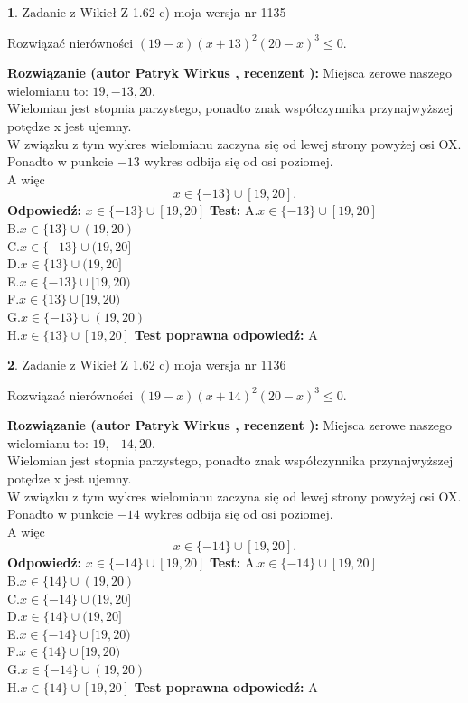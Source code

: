 \documentclass[12pt, a4paper]{article}
\theoremstyle{definition} %
\newtheorem{zad}{}
\newcommand{\zadStart}[1]{\begin{zad}#1\newline}
\newcommand{\zadStop}{\end{zad}}
\newcommand{\rozwStart}[2]{\noindent \textbf{Rozwiązanie (autor #1 , recenzent #2): }\newline}
\newcommand{\rozwStop}{\newline}
\newcommand{\odpStart}{\noindent \textbf{Odpowiedź:}\newline}
\newcommand{\odpStop}{\newline}
\newcommand{\testStart}{\noindent \textbf{Test:}\newline}
\newcommand{\testStop}{\newline}
\newcommand{\kluczStart}{\noindent \textbf{Test poprawna odpowiedź:}\newline}
\newcommand{\kluczStop}{\newline}
\begin{document}
\zadStart{Zadanie z Wikieł Z 1.62 c) moja wersja nr 1135}

Rozwiązać nierówności $(19-x)(x+13)^{2}(20-x)^{3}\le0$.
\zadStop
\rozwStart{Patryk Wirkus}{}
Miejsca zerowe naszego wielomianu to: $19, -13, 20$.\\
Wielomian jest stopnia parzystego, ponadto znak współczynnika przy\linebreak najwyższej potędze x jest ujemny.\\ W związku z tym wykres wielomianu zaczyna się od lewej strony powyżej osi OX.\\
Ponadto w punkcie $-13$ wykres odbija się od osi poziomej.\\
A więc $$x \in \{-13\} \cup [19,20].$$
\rozwStop
\odpStart
$x \in \{-13\} \cup [19,20]$
\odpStop
\testStart
A.$x \in \{-13\} \cup [19,20]$\\
B.$x \in \{13\} \cup (19,20)$\\
C.$x \in \{-13\} \cup (19,20]$\\
D.$x \in \{13\} \cup (19,20]$\\
E.$x \in \{-13\} \cup [19,20)$\\
F.$x \in \{13\} \cup [19,20)$\\
G.$x \in \{-13\} \cup (19,20)$\\
H.$x \in \{13\} \cup [19,20]$
\testStop
\kluczStart
A
\kluczStop



\zadStart{Zadanie z Wikieł Z 1.62 c) moja wersja nr 1136}

Rozwiązać nierówności $(19-x)(x+14)^{2}(20-x)^{3}\le0$.
\zadStop
\rozwStart{Patryk Wirkus}{}
Miejsca zerowe naszego wielomianu to: $19, -14, 20$.\\
Wielomian jest stopnia parzystego, ponadto znak współczynnika przy\linebreak najwyższej potędze x jest ujemny.\\ W związku z tym wykres wielomianu zaczyna się od lewej strony powyżej osi OX.\\
Ponadto w punkcie $-14$ wykres odbija się od osi poziomej.\\
A więc $$x \in \{-14\} \cup [19,20].$$
\rozwStop
\odpStart
$x \in \{-14\} \cup [19,20]$
\odpStop
\testStart
A.$x \in \{-14\} \cup [19,20]$\\
B.$x \in \{14\} \cup (19,20)$\\
C.$x \in \{-14\} \cup (19,20]$\\
D.$x \in \{14\} \cup (19,20]$\\
E.$x \in \{-14\} \cup [19,20)$\\
F.$x \in \{14\} \cup [19,20)$\\
G.$x \in \{-14\} \cup (19,20)$\\
H.$x \in \{14\} \cup [19,20]$
\testStop
\kluczStart
A
\kluczStop
\end{document}
